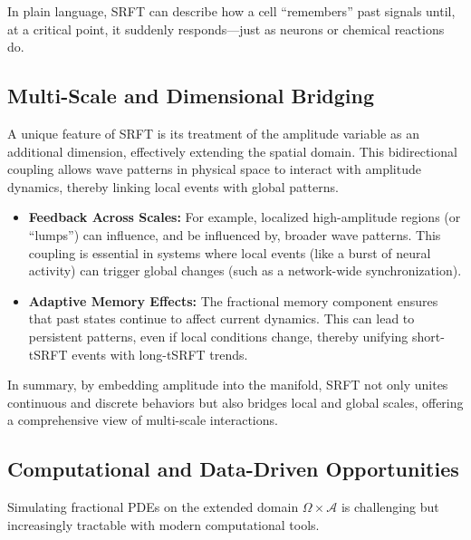 \documentclass[12pt]{article}
\begin{document}
\noindent
In plain language, SRFT can describe how a cell “remembers” past signals until, at a critical point, it suddenly responds—just as neurons or chemical reactions do.

\medskip

\subsection{Multi-Scale and Dimensional Bridging}
A unique feature of SRFT is its treatment of the amplitude variable as an additional dimension, effectively extending the spatial domain. This bidirectional coupling allows wave patterns in physical space to interact with amplitude dynamics, thereby linking local events with global patterns.

\begin{itemize}
    \item \textbf{Feedback Across Scales:}  
          For example, localized high-amplitude regions (or “lumps”) can influence, and be influenced by, broader wave patterns. This coupling is essential in systems where local events (like a burst of neural activity) can trigger global changes (such as a network-wide synchronization).
    \item \textbf{Adaptive Memory Effects:}  
          The fractional memory component ensures that past states continue to affect current dynamics. This can lead to persistent patterns, even if local conditions change, thereby unifying short-tSRFT events with long-tSRFT trends.
\end{itemize}

\noindent
In summary, by embedding amplitude into the manifold, SRFT not only unites continuous and discrete behaviors but also bridges local and global scales, offering a comprehensive view of multi-scale interactions.

\medskip

\subsection{Computational and Data-Driven Opportunities}
Simulating fractional PDEs on the extended domain $\Omega \times \mathcal{A}$ is challenging but increasingly tractable with modern computational tools.
\end{document}
